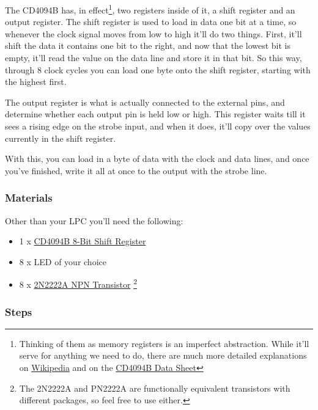 \documentclass[]{article}
\begin{document}
The CD4094B has, in effect\footnote{Thinking of them as memory registers
  is an imperfect abstraction. While it'll serve for anything we need to
  do, there are much more detailed explanations on
  \href{http://en.wikipedia.org/wiki/Shift_register}{Wikipedia} and on
  the \href{http://www.ti.com/lit/ds/symlink/cd4094b.pdf}{CD4094B Data
  Sheet}}, two registers inside of it, a shift register and an output
register. The shift register is used to load in data one bit at a time,
so whenever the clock signal moves from low to high it'll do two things.
First, it'll shift the data it contains one bit to the right, and now
that the lowest bit is empty, it'll read the value on the data line and
store it in that bit. So this way, through 8 clock cycles you can load
one byte onto the shift register, starting with the highest first.

The output register is what is actually connected to the external pins,
and determine whether each output pin is held low or high. This register
waits till it sees a rising edge on the strobe input, and when it does,
it'll copy over the values currently in the shift register.

With this, you can load in a byte of data with the clock and data lines,
and once you've finished, write it all at once to the output with the
strobe line.

\subsubsection{Materials}

Other than your LPC you'll need the following:

\begin{itemize}
\itemsep1pt\parskip0pt
\item
  1 x \href{http://www.ti.com/lit/ds/symlink/cd4094b.pdf}{CD4094B 8-Bit
  Shift Register}
\item
  8 x LED of your choice
\item
  8 x \href{http://www.fairchildsemi.com/ds/PN/PN2222A.pdf}{2N2222A NPN
  Transistor} \footnote{The 2N2222A and PN2222A are functionally
    equivalent transistors with different packages, so feel free to use
    either.}
\end{itemize}

\subsubsection{Steps}
\end{document}
